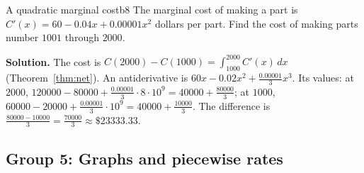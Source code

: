 \documentclass[11pt]{article}
\begin{document}
\begin{exmp}{A quadratic marginal cost}{b8}
The marginal cost of making a part is $C'(x)=60-0.04x+0.00001x^2$ dollars per part. Find the cost of making parts number $1001$ through $2000$.

\textbf{Solution.} The cost is $C(2000)-C(1000)=\int_{1000}^{2000}C'(x)\,dx$ (Theorem~\ref{thm:net}). An antiderivative is $60x-0.02x^2+\frac{0.00001}3x^3$. Its values: at $2000$, $120000-80000+\frac{0.00001}3\cdot8\cdot10^9=40000+\frac{80000}3$; at $1000$, $60000-20000+\frac{0.00001}3\cdot10^9=40000+\frac{10000}3$. The difference is $\frac{80000-10000}3=\frac{70000}3\approx\$23333.33$.
\end{exmp}

\subsection*{Group 5: Graphs and piecewise rates}
\end{document}
